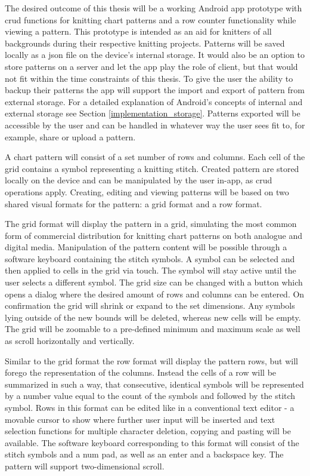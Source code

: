 The desired outcome of this thesis will be a working Android app prototype with \gls{crud} functions for knitting chart patterns and a row counter functionality while viewing a pattern. This prototype is intended as an aid for knitters of all backgrounds during their respective knitting projects. Patterns will be saved locally as a \gls{json} file on the device's internal storage. It would also be an option to store patterns on a server and let the app play the role of client, but that would not fit within the time constraints of this thesis. To give the user the ability to backup their patterns the app will support the import and export of pattern from external storage. For a detailed explanation of Android's concepts of internal and external storage see Section \ref{implementation_storage}. Patterns exported will be accessible by the user and can be handled in whatever way the user sees fit to, for example, share or upload a pattern.

A chart pattern will consist of a set number of rows and columns. Each cell of the grid contains a symbol representing a knitting stitch. Created pattern are stored locally on the device and can be manipulated by the user in-app, as \gls{crud} operations apply. Creating, editing and viewing patterns will be based on two shared visual formats for the pattern: a grid format and a row format.

The grid format will display the pattern in a grid, simulating the most common form of commercial distribution for knitting chart patterns on both analogue and digital media. Manipulation of the pattern content will be possible through a software keyboard containing the stitch symbols. A symbol can be selected and then applied to cells in the grid via touch. The symbol will stay active until the user selects a different symbol. The grid size can be changed with a button which opens a dialog where the desired amount of rows and columns can be entered. On confirmation the grid will shrink or expand to the set dimensions. Any symbols lying outside of the new bounds will be deleted, whereas new cells will be empty. The grid will be zoomable to a pre-defined minimum and maximum scale as well as scroll horizontally and vertically.

Similar to the grid format the row format will display the pattern rows, but will forego the representation of the columns. Instead the cells of a row will be summarized in such a way, that consecutive, identical symbols will be represented  by a number value equal to the count of the symbols and followed by the stitch symbol. Rows in this format can be edited like in  a conventional text editor - a movable cursor to show where further user input will be inserted and text selection functions for multiple character deletion, copying and pasting will be available. The software keyboard corresponding to this format will consist of the stitch symbols and a num pad, as well as an enter and a backspace key. The pattern will support two-dimensional scroll.

